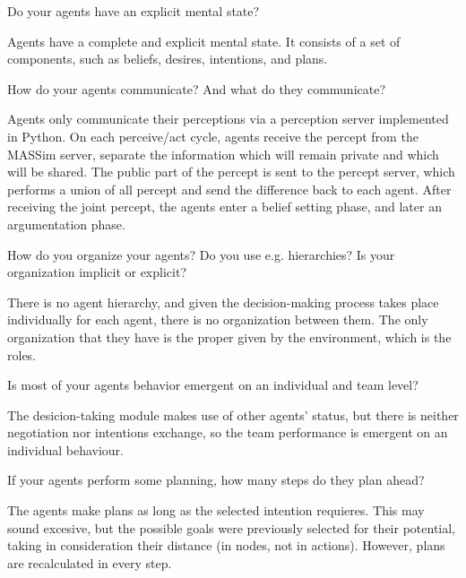 \begin{question}
Do your agents have an explicit mental state?
\end{question}

Agents have a complete and explicit mental state. It consists of a set of 
components, such as beliefs, desires, intentions, and plans. 

\begin{question}
How do your agents communicate? And what do they communicate?  
\end{question}

Agents only communicate their perceptions via a perception server implemented 
in Python.
On each perceive/act cycle, agents receive the percept from the
MASSim server, separate the information which will remain private and which
will be shared.  The public part of the percept is sent to the percept server,
which performs a union of all percept and send the difference back to each
agent. After receiving the joint percept, the agents enter a belief setting
phase, and later an argumentation phase.

\begin{question}
How do you organize your agents? Do you use e.g. hierarchies? Is your
organization implicit or explicit?
\end{question}
There is no agent hierarchy, and given the decision-making process takes
place individually for each agent, there is no organization between them.
The only organization that they have is the proper given by the environment, 
which is the roles.

\begin{question}
Is most of your agents behavior emergent on an individual and team
level?
\end{question}
The desicion-taking module makes use of other agents' status, but there is 
neither negotiation nor intentions exchange, so the team performance is 
emergent on an individual behaviour.

\begin{question}
If your agents perform some planning, how many steps do they plan ahead?
\end{question}

The agents make plans as long as the selected intention requieres. This may
sound excesive, but the possible goals were previously selected for their
potential, taking in consideration their distance (in nodes, not in actions).
However, plans are recalculated in every step.

